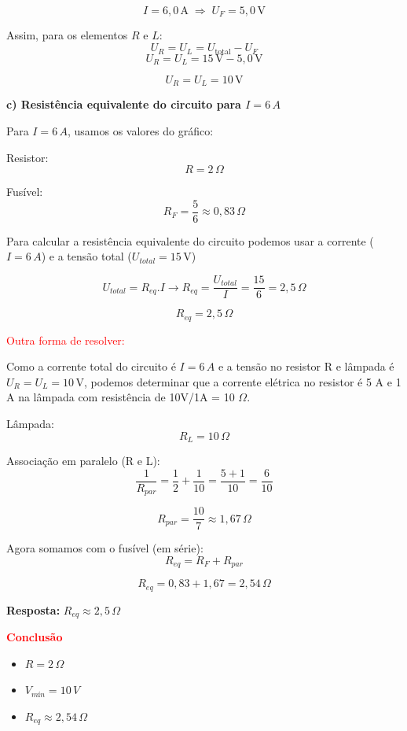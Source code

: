 \documentclass[a4paper,12pt]{article}
\begin{document}
\[
I = 6{,}0\,\text{A} \;\Rightarrow\; U_F = 5{,}0\,\text{V}
\]

Assim, para os elementos $R$ e $L$:
\[
U_R = U_L = U_{\text{total}} - U_F
\]
\[
U_R = U_L = 15\,\text{V} - 5{,}0\,\text{V}
\]

\[
\boxed{U_R = U_L = 10\,\text{V}}
\]


\vspace{0.5cm}

\textbf{c) Resistência equivalente do circuito para $I = 6\,A$}

Para $I = 6\,A$, usamos os valores do gráfico:

Resistor:
\[
R = 2\,\Omega
\]

Fusível:
\[
R_F = \frac{5}{6} \approx 0{,}83\,\Omega
\]

Para calcular a resist\^encia equivalente do circuito podemos usar a 
corrente ($I = 6\,A$) e a tens\~ao total ($U_{total} = 15\,\text{V}$)

\[
U_{total} = R_{eq} . I \rightarrow R_{eq} = \frac{U_{total}}{I} = \frac{15}{6} = 2{,}5\,\Omega
\]

\[
\boxed{
R_{eq} = 2{,}5\,\Omega
}
\]

\textcolor{red}{Outra forma de resolver:}

Como a corrente total do circuito \'e $I = 6\,A$ e a tens\~ao no resistor R 
e l\^ampada \'e $U_R = U_L = 10\,\text{V}$, podemos determinar que a
corrente el\'etrica no resistor \'e 5 A e 1 A na l\^ampada com resist\^encia
de 10V/1A = 10 $\Omega$. 



Lâmpada:
\[
R_L = 10\,\Omega
\]

Associação em paralelo (R e L):
\[
\frac{1}{R_{par}} = \frac{1}{2} + \frac{1}{10}
= \frac{5 + 1}{10} = \frac{6}{10}
\]

\[
R_{par} = \frac{10}{7} \approx 1{,}67\,\Omega
\]

Agora somamos com o fusível (em série):
\[
R_{eq} = R_F + R_{par}
\]

\[
R_{eq} = 0{,}83 + 1{,}67 = 2{,}54\,\Omega
\]

\textbf{Resposta:} $R_{eq} \approx 2{,}5\,\Omega$

\vspace{0.5cm}

\textbf{\textcolor{red}{Conclusão}}\\

\begin{itemize}
\item[(a)] $R = 2\,\Omega$
\item[(b)] $V_{mín} = 10\,V$
\item[(c)] $R_{eq} \approx 2{,}54\,\Omega$
\end{itemize}
\end{document}
